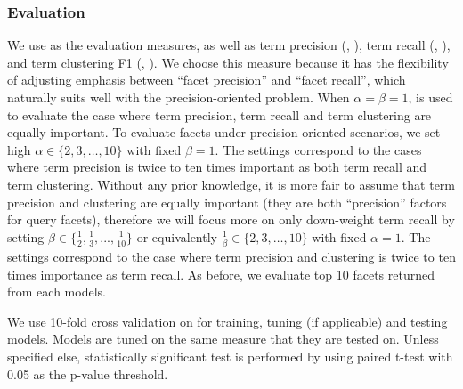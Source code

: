 \subsubsection{Evaluation}
We use \PRF as the evaluation measures, as well as term precision (\ie, \TP), term recall (\ie, \TR), and term clustering F1 (\ie, \PF). 
We choose this measure because it has the flexibility of adjusting emphasis between ``facet precision'' and ``facet recall'', which naturally suits well with the precision-oriented problem.
When $\alpha\!=\!\beta=\!1\!$,  is used to evaluate the case where term precision, term recall and term clustering are equally important. To evaluate facets under precision-oriented scenarios, we set high $\alpha \in \{2, 3, \dots, 10\}$ with fixed $\beta\!=\!1$. The settings correspond to the cases where term precision is twice to ten times important as both term recall and term clustering. Without any prior knowledge, it is more fair to assume that term precision and clustering are equally important (they are both ``precision'' factors for query facets), therefore we will focus more on only down-weight term recall by setting $\beta \in \{\frac{1}{2}, \frac{1}{3}, ..., \frac{1}{10}\}$ or equivalently $\frac{1}{\beta} \in \{2, 3, \dots, 10\}$ with fixed $\alpha\!=\!1$. The settings correspond to the case where term precision and clustering is twice to ten times importance as term recall. As before, we evaluate top 10 facets returned from each models.

We use 10-fold cross validation on \DQF for training, tuning (if applicable) and testing models. Models are tuned on the same \PRF measure that they are tested on. Unless specified else, statistically significant test is performed by using paired t-test with 0.05 as the p-value threshold.


